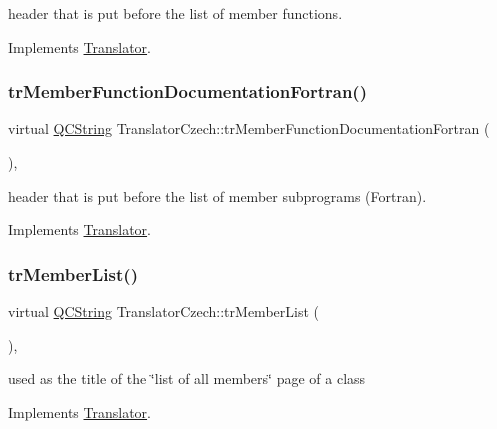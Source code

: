 header that is put before the list of member functions. 

Implements \mbox{\hyperlink{class_translator}{Translator}}.

\mbox{\label{class_translator_czech_ae1c9fbd277a3a3f61bbb2c953fe86585}} 
\subsubsection{\texorpdfstring{trMemberFunctionDocumentationFortran()}{trMemberFunctionDocumentationFortran()}}
{\footnotesize\ttfamily virtual \mbox{\hyperlink{class_q_c_string}{Q\+C\+String}} Translator\+Czech\+::tr\+Member\+Function\+Documentation\+Fortran (\begin{DoxyParamCaption}{ }\end{DoxyParamCaption})\hspace{0.3cm}{\ttfamily [inline]}, {\ttfamily [virtual]}}

header that is put before the list of member subprograms (Fortran). 

Implements \mbox{\hyperlink{class_translator}{Translator}}.

\mbox{\label{class_translator_czech_a56d1c8c1cad33305514f42eb1dd0b06d}} 
\subsubsection{\texorpdfstring{trMemberList()}{trMemberList()}}
{\footnotesize\ttfamily virtual \mbox{\hyperlink{class_q_c_string}{Q\+C\+String}} Translator\+Czech\+::tr\+Member\+List (\begin{DoxyParamCaption}{ }\end{DoxyParamCaption})\hspace{0.3cm}{\ttfamily [inline]}, {\ttfamily [virtual]}}

used as the title of the \char`\"{}list of all members\char`\"{} page of a class 

Implements \mbox{\hyperlink{class_translator}{Translator}}.


